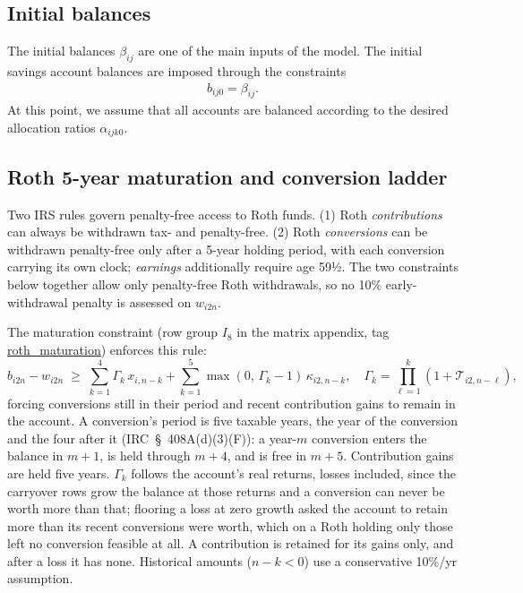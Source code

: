 \documentclass[fleqn,12pt]{report}
\newcommand{\code}[1]{\url{#1}}
\begin{document}
\subsection{Initial balances}
	The initial balances $\beta_{ij}$ are one of the main inputs of the model.
	The initial savings account balances are imposed through the constraints
	\begin{eqnarray}
		\label{Eq:InitialBalance}
		b_{ij0} = \beta_{ij}.
	\end{eqnarray}
	At this point, we assume that all accounts are balanced according to the desired
	allocation ratios $\alpha_{ijk0}$.

\subsection{Roth 5-year maturation and conversion ladder}
\label{Sec:RothMaturation}
	Two IRS rules govern penalty-free access to Roth funds.
	(1) Roth \emph{contributions} can always be withdrawn tax- and penalty-free.
	(2) Roth \emph{conversions} can be withdrawn penalty-free only after a 5-year holding period,
	with each conversion carrying its own clock; \emph{earnings} additionally require age 59½.
	The two constraints below together allow only penalty-free Roth withdrawals, so no 10\%
	early-withdrawal penalty is assessed on $w_{i2n}$.

	The maturation constraint (row group $I_8$ in the matrix appendix, tag
	\code{roth_maturation}) enforces this rule:
	\begin{equation}
		b_{i2n} - w_{i2n} \;\geq\;
		\sum_{k=1}^{4} \Gamma_k\, x_{i,n-k}
		+ \sum_{k=1}^{5} \max(0,\,\Gamma_k - 1)\,\kappa_{i2,n-k},
		\quad \Gamma_k = \prod_{\ell=1}^{k}(1+\mathcal{T}_{i2,n-\ell}),
	\end{equation}
	forcing conversions still in their period and recent contribution gains to remain in the
	account.  A conversion's period is five taxable years, the year of the conversion and the
	four after it (IRC~§~408A(d)(3)(F)): a year-$m$ conversion enters the balance in $m+1$, is
	held through $m+4$, and is free in $m+5$.  Contribution gains are held five years.
	$\Gamma_k$ follows the account's real returns, losses included, since the carryover rows
	grow the balance at those returns and a conversion can never be worth more than that;
	flooring a loss at zero growth asked the account to retain more than its recent conversions
	were worth, which on a Roth holding only those left no conversion feasible at all.
	A contribution is retained for its gains only, and after a loss it has none.
	Historical amounts ($n-k < 0$) use a conservative 10\%/yr assumption.
\end{document}
